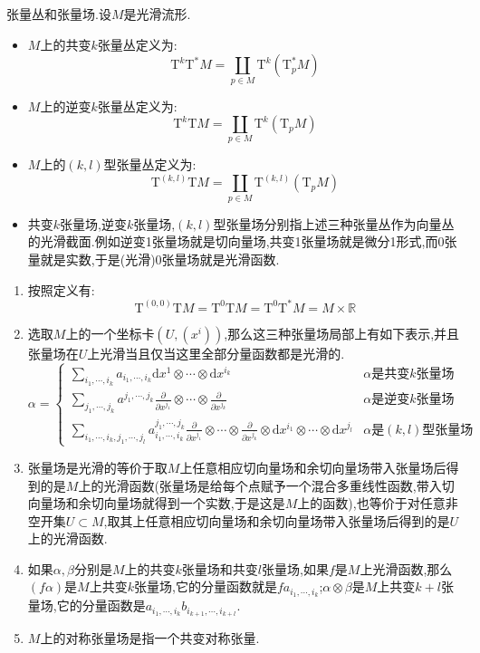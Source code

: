张量丛和张量场.设$M$是光滑流形.
\begin{itemize}
	\item $M$上的共变$k$张量丛定义为:$$\mathrm{T}^k\mathrm{T}^*M=\coprod_{p\in M}\mathrm{T}^k(\mathrm{T}_p^*M)$$
	\item $M$上的逆变$k$张量丛定义为:$$\mathrm{T}^k\mathrm{T}M=\coprod_{p\in M}\mathrm{T}^k(\mathrm{T}_pM)$$
	\item $M$上的$(k,l)$型张量丛定义为:$$\mathrm{T}^{(k,l)}\mathrm{T}M=\coprod_{p\in M}\mathrm{T}^{(k,l)}(\mathrm{T}_pM)$$
	\item 共变$k$张量场,逆变$k$张量场,$(k,l)$型张量场分别指上述三种张量丛作为向量丛的光滑截面.例如逆变1张量场就是切向量场,共变1张量场就是微分1形式,而0张量就是实数,于是(光滑)0张量场就是光滑函数.
\end{itemize}
\begin{enumerate}
	\item 按照定义有:
	$$\mathrm{T}^{(0,0)}\mathrm{T}M=\mathrm{T}^0\mathrm{T}M=\mathrm{T}^0\mathrm{T}^*M=M\times\mathbb{R}$$
	\item 选取$M$上的一个坐标卡$(U,(x^i))$,那么这三种张量场局部上有如下表示,并且张量场在$U$上光滑当且仅当这里全部分量函数都是光滑的.
	$$\alpha=\left\{\begin{array}{cc}\sum_{i_1,\cdots,i_k}a_{i_1,\cdots,i_k}\mathrm{d}x^1\otimes\cdots\otimes\mathrm{d}x^{i_k}&\alpha\text{是共变$k$张量场}\\\sum_{j_1,\cdots,j_k}a^{j_1,\cdots,j_k}\frac{\partial}{\partial x^{j_1}}\otimes\cdots\otimes\frac{\partial}{\partial x^{j_k}}&\alpha\text{是逆变$k$张量场}\\\sum_{i_1,\cdots,i_k,j_1,\cdots,j_l}a_{i_1,\cdots,i_k}^{j_1,\cdots,j_k}\frac{\partial}{\partial x^{j_1}}\otimes\cdots\otimes\frac{\partial}{\partial x^{j_k}}\otimes\mathrm{d}x^{i_1}\otimes\cdots\otimes\mathrm{d}x^{j_l}&\alpha\text{是$(k,l)$型张量场}\end{array}\right.$$
	\item 张量场是光滑的等价于取$M$上任意相应切向量场和余切向量场带入张量场后得到的是$M$上的光滑函数(张量场是给每个点赋予一个混合多重线性函数,带入切向量场和余切向量场就得到一个实数,于是这是$M$上的函数),也等价于对任意非空开集$U\subset M$,取其上任意相应切向量场和余切向量场带入张量场后得到的是$U$上的光滑函数.
	\item 如果$\alpha,\beta$分别是$M$上的共变$k$张量场和共变$l$张量场,如果$f$是$M$上光滑函数,那么$(f\alpha)$是$M$上共变$k$张量场,它的分量函数就是$fa_{i_1,\cdots,i_k}$;$\alpha\otimes\beta$是$M$上共变$k+l$张量场,它的分量函数是$a_{i_1,\cdots,i_k}b_{i_{k+1},\cdots,i_{k+l}}$.
	\item $M$上的对称张量场是指一个共变对称张量.
\end{enumerate}

